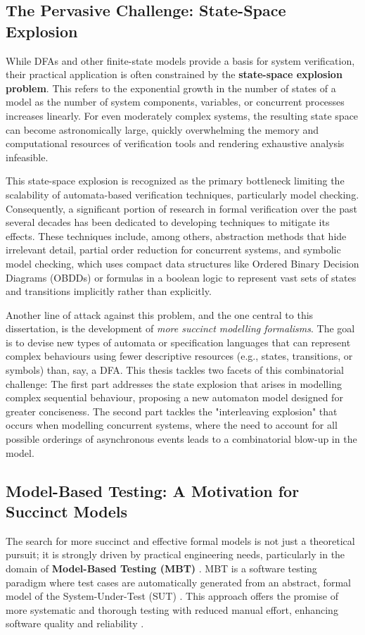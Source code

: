\subsection*{The Pervasive Challenge: State-Space Explosion}
While DFAs and other finite-state models provide a basis for system verification, their practical application is often constrained by the \textbf{state-space explosion problem}. This refers to the exponential growth in the number of states of a model as the number of system components, variables, or concurrent processes increases linearly. For even moderately complex systems, the resulting state space can become astronomically large, quickly overwhelming the memory and computational resources of verification tools and rendering exhaustive analysis infeasible.

This state-space explosion is recognized as the primary bottleneck limiting the scalability of automata-based verification techniques, particularly model checking. Consequently, a significant portion of research in formal verification over the past several decades has been dedicated to developing techniques to mitigate its effects. These techniques include, among others, abstraction methods that hide irrelevant detail, partial order reduction for concurrent systems, and symbolic model checking, which uses compact data structures like Ordered Binary Decision Diagrams (OBDDs) or formulas in a boolean logic to represent vast sets of states and transitions implicitly rather than explicitly.

Another line of attack against this problem, and the one central to this dissertation, is the development of \emph{more succinct modelling formalisms}. The goal is to devise new types of automata or specification languages that can represent complex behaviours using fewer descriptive resources (e.g., states, transitions, or symbols) than, say, a DFA. This thesis tackles two facets of this combinatorial challenge: The first part addresses the state explosion that arises in modelling complex sequential behaviour, proposing a new automaton model \cite{DBLP:journals/corr/abs-2410-22761} designed for greater conciseness. The second part tackles the "interleaving explosion" \cite{Keerthan2025netys} that occurs when modelling concurrent systems, where the need to account for all possible orderings of asynchronous events leads to a combinatorial blow-up in the model.

\subsection*{Model-Based Testing: A Motivation for Succinct Models}
The search for more succinct and effective formal models is not just a theoretical pursuit; it is strongly driven by practical engineering needs, particularly in the domain of \textbf{Model-Based Testing (MBT)} \cite{10.1145/1353673.1353681}. MBT is a software testing paradigm where test cases are automatically generated from an abstract, formal model of the System-Under-Test (SUT) \cite{bs_what_is_mbt}. This approach offers the promise of more systematic and thorough testing with reduced manual effort, enhancing software quality and reliability \cite{rg_survey_mbt_tools}.

